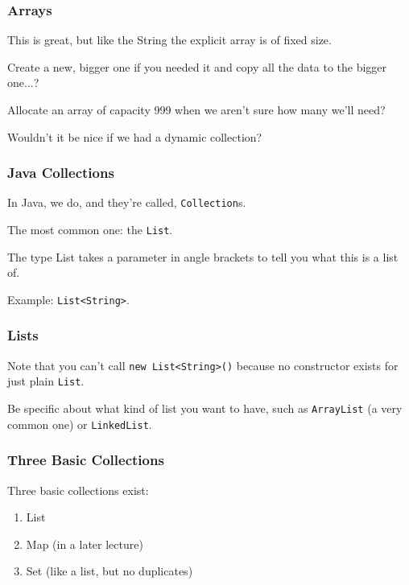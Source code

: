\begin{frame}
\frametitle{Arrays}
\begin{changemargin}{1cm}

This is great, but like the String the explicit array is of fixed size.

Create a new, bigger one if you needed it and copy all the data to the bigger one...? 

Allocate an array of capacity 999 when we aren't sure how many we'll need?

Wouldn't it be nice if we had a dynamic collection?


\end{changemargin}
\end{frame}


\begin{frame}
\frametitle{Java Collections}
\begin{changemargin}{1cm}

In Java, we do, and they're called, \texttt{Collection}s. 

The most common one: the \texttt{List}. 

The type List takes a parameter in angle brackets to tell you what this is a list of. 

Example: \texttt{List<String>}.

\end{changemargin}
\end{frame}

\begin{frame}
\frametitle{Lists}
\begin{changemargin}{1cm}

Note that you can't call \texttt{new List<String>()} because no constructor exists for just plain \texttt{List}. 

Be specific about what kind of list you want to have, such as \texttt{ArrayList} (a very common one) or \texttt{LinkedList}.


\end{changemargin}
\end{frame}

\begin{frame}
\frametitle{Three Basic Collections}
\begin{changemargin}{1cm}

Three basic collections exist:

\begin{enumerate}
	\item List
	\item Map (in a later lecture)
	\item Set (like a list, but no duplicates)
\end{enumerate}


\end{changemargin}
\end{frame}

